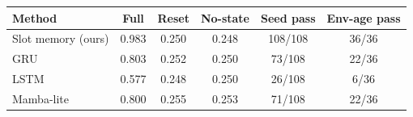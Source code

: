 \begin{tabular}{lccccc}
\toprule
Method & Full & Reset & No-state & Seed pass & Env-age pass\\
\midrule
\rowcolor{MemCream}Slot memory (ours) & 0.983 & 0.250 & 0.248 & 108/108 & 36/36\\
GRU & 0.803 & 0.252 & 0.250 & 73/108 & 22/36\\
LSTM & 0.577 & 0.248 & 0.250 & 26/108 & 6/36\\
Mamba-lite & 0.800 & 0.255 & 0.253 & 71/108 & 22/36\\
\bottomrule
\end{tabular}
